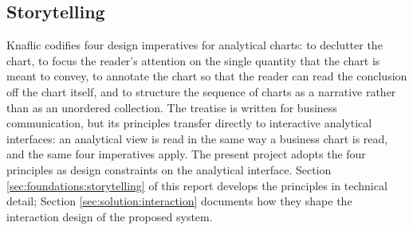 \subsection{Storytelling}
\label{sec:related:viz:storytelling}

Knaflic \cite{knaflic2015} codifies four design imperatives for analytical charts:
to declutter the chart, to focus the reader's attention on the single quantity that the
chart is meant to convey, to annotate the chart so that the reader can read the
conclusion off the chart itself, and to structure the sequence of charts as a narrative
rather than as an unordered collection. The treatise is written for business
communication, but its principles transfer directly to interactive analytical interfaces:
an analytical view is read in the same way a business chart is read, and the same four
imperatives apply. The present project adopts the four principles as design constraints
on the analytical interface. Section \ref{sec:foundations:storytelling} of this report
develops the principles in technical detail; Section \ref{sec:solution:interaction}
documents how they shape the interaction design of the proposed system.
